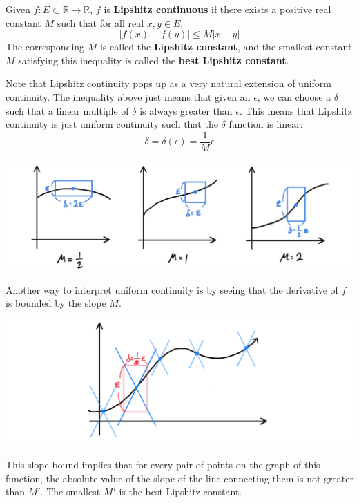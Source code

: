   \begin{definition}
    Given $f: E \subset \mathbb{R} \longrightarrow \mathbb{R}$, $f$ is \textbf{Lipshitz continuous} if there exists a positive real constant $M$ such that for all real $x, y \in E$, 
    \[\big| f(x) - f(y) \big| \leq M \big| x - y \big|\]
    The corresponding $M$ is called the \textbf{Lipshitz constant}, and the smallest constant $M$ satisfying this inequality is called the \textbf{best Lipshitz constant}. 

    Note that Lipshitz continuity pops up as a very natural extension of uniform continuity. The inequality above just means that given an $\epsilon$, we can choose a $\delta$ such that a linear multiple of $\delta$ is always greater than $\epsilon$. This means that Lipshitz continuity is just uniform continuity such that the $\delta$ function is linear:  
    \[\delta = \delta(\epsilon) = \frac{1}{M} \epsilon\]
    \begin{center}
        \includegraphics[scale=0.25]{img/Lipshitz_Continuity.jpg}
    \end{center}
  \end{definition}

  Another way to interpret uniform continuity is by seeing that the derivative of $f$ is bounded by the slope $M$. 
  \begin{center}
      \includegraphics[scale=0.3]{img/Lipshitz_Continuity_Slope_Bound.PNG}
  \end{center}
  This slope bound implies that for every pair of points on the graph of this function, the absolute value of the slope of the line connecting them is not greater than $M'$. The smallest $M'$ is the best Lipshitz constant. 


